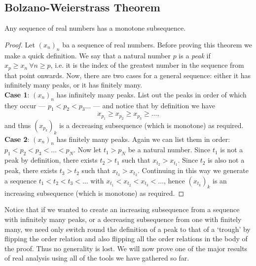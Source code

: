 \documentclass[../real_analysis.tex]{subfiles}
\begin{document}
        \subsection{Bolzano-Weierstrass Theorem}\label{subsec:bolzano-weierstrass-theorem}
            \begin{theorem}\label{thm:MST}
                Any sequence of real numbers has a monotone subsequence.
            \end{theorem}
            \begin{proof}
                Let $(x_n)_n$ ba a sequence of real numbers. Before proving this theorem we make a quick definition. We say that a natural number $p$ is a \textit{peak} if $x_p\geq x_n\ \forall n\geq p$, i.e. it is the index of the greatest number in the sequence from that point onwards. Now, there are two cases for a general sequence: either it has infinitely many peaks, or it has finitely many.\\
                \textbf{Case 1}: $(x_n)_n$ has infinitely many peaks. List out the peaks in order of which they occur --- $p_1<p_2<p_3\dots$ --- and notice that by definition we have
                \begin{equation}
                    x_{p_1}\geq x_{p_2}\geq x_{p_3}\geq\dots,
                \end{equation}
                and thus $(x_{p_k})_k$ is a decreasing subsequence (which is monotone) as required.\\
                \textbf{Case 2}: $(x_n)_n$ has finitely many peaks. Again we can list them in order: $p_1<p_2<p_3<\dots<p_N$. Now let $t_1>p_N$ be a natural number. Since $t_1$ is not a peak by definition, there exists $t_2>t_1$ such that $x_{t_2}>x_{t_1}$. Since $t_2$ is also not a peak, there exists $t_3>t_2$ such that $x_{t_3}>x_{t_2}$. Continuing in this way we generate a sequence $t_1<t_2<t_3<\dots$ with $x_{t_1}<x_{t_2}<x_{t_3}<\dots$, hence $(x_{t_k})_k$ is an increasing subsequence (which is monotone) as required.
            \end{proof}
            Notice that if we wanted to create an increasing subsequence from a sequence with infinitely many peaks, or a decreasing subsequence from one with finitely many, we need only switch round the definition of a peak to that of a `trough' by flipping the order relation and also flipping all the order relations in the body of the proof. Thus no generality is lost. We will now prove one of the major results of real analysis using all of the tools we have gathered so far.
\end{document}
